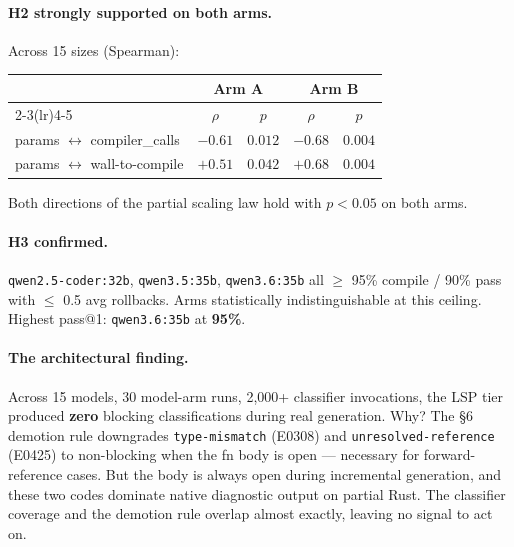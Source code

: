 \documentclass[11pt]{article}
\begin{document}
\paragraph{H2 strongly supported on both arms.} Across 15 sizes (Spearman):
{\small
\begin{center}
\begin{tabular}{lcccc}
\toprule
& \multicolumn{2}{c}{\textbf{Arm A}} & \multicolumn{2}{c}{\textbf{Arm B}}\\
\cmidrule(lr){2-3}\cmidrule(lr){4-5}
& $\rho$ & $p$ & $\rho$ & $p$ \\
\midrule
params $\leftrightarrow$ compiler\_calls & $-0.61$ & $0.012$ & $-0.68$ & $0.004$ \\
params $\leftrightarrow$ wall-to-compile & $+0.51$ & $0.042$ & $+0.68$ & $0.004$ \\
\bottomrule
\end{tabular}\end{center}}

Both directions of the partial scaling law hold with $p<0.05$ on both arms.

\paragraph{H3 confirmed.} \texttt{qwen2.5-coder:32b}, \texttt{qwen3.5:35b}, \texttt{qwen3.6:35b} all $\geq$ 95\% compile / 90\% pass with $\leq$ 0.5 avg rollbacks. Arms statistically indistinguishable at this ceiling. Highest pass@1: \texttt{qwen3.6:35b} at \textbf{95\%}.

\paragraph{The architectural finding.} Across 15 models, 30 model-arm runs, 2,000+ classifier invocations, the LSP tier produced \textbf{zero} blocking classifications during real generation. Why? The §6 demotion rule downgrades \texttt{type-mismatch} (E0308) and \texttt{unresolved-reference} (E0425) to non-blocking when the fn body is open — necessary for forward-reference cases. But the body is always open during incremental generation, and these two codes dominate native diagnostic output on partial Rust. The classifier coverage and the demotion rule overlap almost exactly, leaving no signal to act on.
\end{document}
